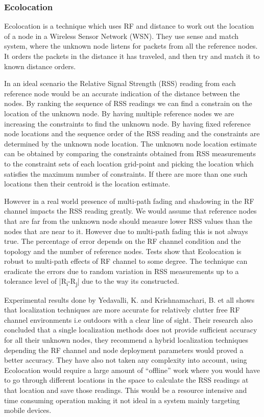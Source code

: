 \subsubsection{Ecolocation}

Ecolocation\cite{Ecolocation} is a technique which uses RF and distance
to work out the location of a node in a Wireless Sensor Network (WSN).
They use sense and match system, where the unknown node listens for
packets from all the reference nodes. It orders the packets in the
distance it has traveled, and then try and match it to known distance
orders. 

In an ideal scenario the Relative Signal Strength (RSS) reading from
each reference node would be an accurate indication of the distance
between the nodes. By ranking the sequence of RSS readings we can
find a constrain on the location of the unknown node. By having multiple
reference nodes we are increasing the constraints to find the unknown
node. By having fixed reference node locations and the sequence order
of the RSS reading and the constraints are determined by the unknown
node location. The unknown node location estimate can be obtained
by comparing the constraints obtained from RSS measurements to the
constraint sets of each location grid-point and picking the location
which satisfies the maximum number of constraints. If there are more
than one such locations then their centroid is the location estimate.

However in a real world presence of multi-path fading and shadowing
in the RF channel impacts the RSS reading greatly. We would assume
that reference nodes that are far from the unknown node should measure
lower RSS values than the nodes that are near to it. However due to
multi-path fading this is not always true. The percentage of error
depends on the RF channel condition and the topology and the number
of reference nodes. Tests show that Ecolocation is robust to multi-path
effects of RF channel to some degree. The technique can eradicate
the errors due to random variation in RSS measurements up to a tolerance
level of |R\textsubscript{i}-R\textsubscript{j}| due to the way
its constructed.

Experimental results done by Yedavalli, K. and Krishnamachari, B.
et all shows that localization techniques are more accurate for relatively
clutter free RF channel environments i.e outdoors with a clear line
of sight. Their research also concluded that a single localization
methods does not provide sufficient accuracy for all their unknown
nodes, they recommend a hybrid localization techniques depending the
RF channel and node deployment parameters would proved a better accuracy.
They have also not taken any complexity into account, using Ecolocation
would require a large amount of ``offline'' work where you would
have to go through different locations in the space to calculate the
RSS readings at that location and save those readings. This would
be a resource intensive and time consuming operation making it not
ideal in a system mainly targeting mobile devices.


